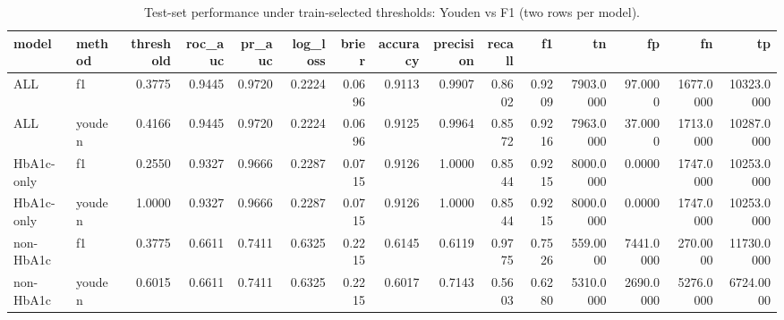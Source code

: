 \begin{table}[H]
\begin{center}
\begin{tabular}{llrrrrrrrrrrrrr}
\toprule
model & method & threshold & roc_auc & pr_auc & log_loss & brier & accuracy & precision & recall & f1 & tn & fp & fn & tp \\
\midrule
ALL & f1 & 0.3775 & 0.9445 & 0.9720 & 0.2224 & 0.0696 & 0.9113 & 0.9907 & 0.8602 & 0.9209 & 7903.0000 & 97.0000 & 1677.0000 & 10323.0000 \\
ALL & youden & 0.4166 & 0.9445 & 0.9720 & 0.2224 & 0.0696 & 0.9125 & 0.9964 & 0.8572 & 0.9216 & 7963.0000 & 37.0000 & 1713.0000 & 10287.0000 \\
HbA1c-only & f1 & 0.2550 & 0.9327 & 0.9666 & 0.2287 & 0.0715 & 0.9126 & 1.0000 & 0.8544 & 0.9215 & 8000.0000 & 0.0000 & 1747.0000 & 10253.0000 \\
HbA1c-only & youden & 1.0000 & 0.9327 & 0.9666 & 0.2287 & 0.0715 & 0.9126 & 1.0000 & 0.8544 & 0.9215 & 8000.0000 & 0.0000 & 1747.0000 & 10253.0000 \\
non-HbA1c & f1 & 0.3775 & 0.6611 & 0.7411 & 0.6325 & 0.2215 & 0.6145 & 0.6119 & 0.9775 & 0.7526 & 559.0000 & 7441.0000 & 270.0000 & 11730.0000 \\
non-HbA1c & youden & 0.6015 & 0.6611 & 0.7411 & 0.6325 & 0.2215 & 0.6017 & 0.7143 & 0.5603 & 0.6280 & 5310.0000 & 2690.0000 & 5276.0000 & 6724.0000 \\
\bottomrule
\end{tabular}
\end{center}
\vspace{-5pt}
\caption{Test-set performance under train-selected thresholds: Youden vs F1 (two rows per model).}
\label{tab:xgb_test_threshold_rule_comparison}
\end{table}
